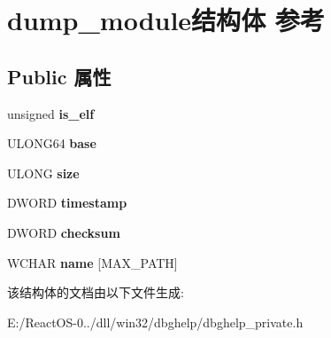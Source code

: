 \hypertarget{structdump__module}{}\section{dump\+\_\+module结构体 参考}
\label{structdump__module}
\subsection*{Public 属性}
\begin{DoxyCompactItemize}
\item 
\mbox{\label{structdump__module_a549323528b9da4f2c7c8a956c623e8a8}} 
unsigned {\bfseries is\+\_\+elf}
\item 
\mbox{\label{structdump__module_a4d58da9a097d03ff945d8893ac04cd4a}} 
U\+L\+O\+N\+G64 {\bfseries base}
\item 
\mbox{\label{structdump__module_aa5fababbb96ab296c9f7fe93218e2a07}} 
U\+L\+O\+NG {\bfseries size}
\item 
\mbox{\label{structdump__module_af69e35e84769c633d998e97def83d8a6}} 
D\+W\+O\+RD {\bfseries timestamp}
\item 
\mbox{\label{structdump__module_a9f2e881715ba8fa16a117679cb6cf4ca}} 
D\+W\+O\+RD {\bfseries checksum}
\item 
\mbox{\label{structdump__module_a95b22c8027405905fccda6b7bbe0a593}} 
W\+C\+H\+AR {\bfseries name} \mbox{[}M\+A\+X\+\_\+\+P\+A\+TH\mbox{]}
\end{DoxyCompactItemize}


该结构体的文档由以下文件生成\+:\begin{DoxyCompactItemize}
\item 
E\+:/\+React\+O\+S-\/0../dll/win32/dbghelp/dbghelp\+\_\+private.\+h\end{DoxyCompactItemize}
